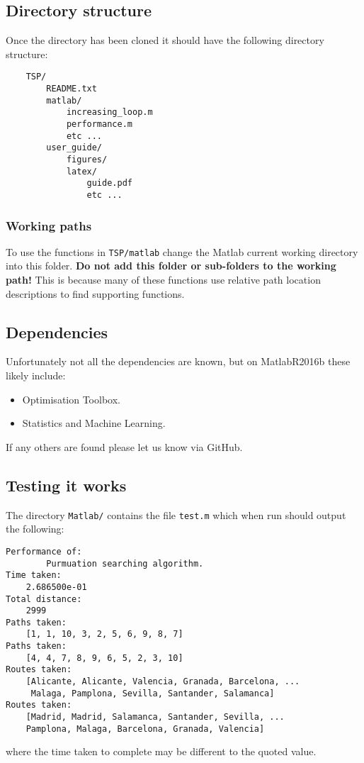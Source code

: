 \subsection{Directory structure}
\label{subsec:directory_structure}

Once the directory has been cloned it should have the following directory structure:
\\
\noindent
\begin{minipage}{\linewidth}
\begin{verbatim}
    TSP/
        README.txt
        matlab/
            increasing_loop.m
            performance.m
            etc ...
        user_guide/
            figures/
            latex/
                guide.pdf
                etc ...
\end{verbatim}
\end{minipage}





\subsubsection{Working paths}
\label{subsubsec:working_paths}

To use the functions in \texttt{TSP/matlab} change the Matlab current working directory into this folder. \textbf{Do not add this folder or sub-folders to the working path!} This is because many of these functions use relative path location descriptions to find supporting functions. 

\subsection{Dependencies}
\label{subsec:dependencies}

Unfortunately not all the dependencies are known, but on Matlab\:R2016b these likely include:
\begin{itemize}
	\item Optimisation Toolbox.
	\item Statistics and Machine Learning.
\end{itemize}
If any others are found please let us know via GitHub.


\subsection{Testing it works}
\label{subsec:testing_it_works}

The directory \texttt{Matlab/} contains the file \verb|test.m| which when run should output the following: \\
\noindent
\begin{verbatim}
Performance of:
        Purmuation searching algorithm.
Time taken:
    2.686500e-01
Total distance:
    2999
Paths taken:
    [1, 1, 10, 3, 2, 5, 6, 9, 8, 7]
Paths taken:
    [4, 4, 7, 8, 9, 6, 5, 2, 3, 10]
Routes taken:
    [Alicante, Alicante, Valencia, Granada, Barcelona, ...
     Malaga, Pamplona, Sevilla, Santander, Salamanca]
Routes taken:
    [Madrid, Madrid, Salamanca, Santander, Sevilla, ...
    Pamplona, Malaga, Barcelona, Granada, Valencia]
\end{verbatim}
where the time taken to complete may be different to the quoted value. 

